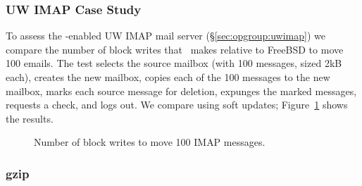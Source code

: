 \subsubsection {UW IMAP Case Study}
\label{sec:evaluation:uwimap}
To assess the \opgroup-enabled UW IMAP mail server
(\S\ref{sec:opgroup:uwimap}) we compare the number of block writes
that \Kudos\ makes relative to FreeBSD to move 100 emails. The test
selects the source mailbox (with 100 messages, sized 2kB each),
creates the new mailbox, copies each of the 100 messages to the new
mailbox, marks each source message for deletion, expunges the marked
messages, requests a check, and logs out. We compare using soft updates;
Figure~\ref{fig:imap-compare} shows the results.

\begin{figure}[htb]
\caption{\label{fig:imap-compare} Number of block writes to move 100
  IMAP messages.}
\end{figure}

\subsubsection {gzip}
